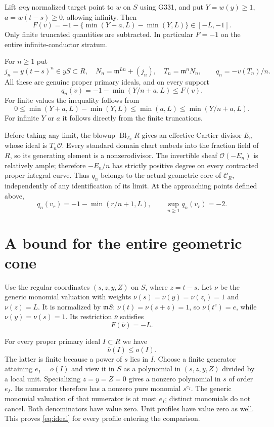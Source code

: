 \documentclass[11pt]{article}
\newcommand{\m}{\mathfrak m}
\newcommand{\Cc}{\mathcal C}
\begin{document}
Lift \emph{any} normalized target point to $w$ on $S$ using G331,
and put $Y=w(y)\ge1$, $a=w(t-s)\ge0$, allowing infinity. Then
\begin{equation}\label{eq:F}
 F(v)=-1-\{\min(Y+a,L)-\min(Y,L)\}\in[-L,-1].
\end{equation}
Only finite truncated quantities are subtracted. In particular
$F=-1$ on the entire infinite-conductor stratum.

For $n\ge1$ put
\[
 j_n=y(t-s)^n\in yS\subset R,\quad
 N_n=\m^{Ln}+(j_n),\quad T_n=\m^nN_n,
 \qquad q_n=-v(T_n)/n.
\]
All these are genuine proper primary ideals, and on every support
\begin{equation}\label{eq:q}
 q_n(v)=-1-\min(Y/n+a,L)\le F(v).
\end{equation}
For finite values the inequality follows from
\[
 0\le\min(Y+a,L)-\min(Y,L)\le\min(a,L)
 \le\min(Y/n+a,L).
\]
For infinite $Y$ or $a$ it follows directly from the finite truncations.

Before taking any limit, the blowup $\operatorname{Bl}_{T_n}R$
gives an effective Cartier divisor $E_n$ whose ideal is $T_n\mathcal O$.
Every standard domain chart embeds into the fraction field of $R$,
so its generating element is a nonzerodivisor.
The invertible sheaf $\mathcal O(-E_n)$ is relatively ample;
therefore $-E_n/n$ has strictly positive degree on every contracted
proper integral curve. Thus $q_n$ belongs to the actual geometric
core of $\Cc_R$, independently of any identification of its limit.
At the approaching points defined above,
\begin{equation}\label{eq:path}
 q_n(v_r)=-1-\min(r/n+1,L),\qquad
 \sup_{n\ge1}q_n(v_r)=-2.
\end{equation}

\section{A bound for the entire geometric cone}
Use the regular coordinates $(s,z,y,Z)$ on $S$, where $z=t-s$.
Let $\nu$ be the generic monomial valuation with weights
$\nu(s)=\nu(y)=\nu(z_i)=1$ and $\nu(z)=L$.
It is normalized by $\m S$: $\nu(t)=\nu(s+z)=1$, so
$\nu(t^e)=e$, while $\nu(y)=\nu(s)=1$.
Its restriction $\bar\nu$ satisfies
\begin{equation}\label{eq:deep}
 F(\bar\nu)=-L.
\end{equation}

For every proper primary ideal $I\subset R$ we have
\begin{equation}\label{eq:ideal}
 \bar\nu(I)\le o(I).
\end{equation}
The latter is finite because a power of $s$ lies in $I$.
Choose a finite generator attaining $e_I=o(I)$ and view it in
$S$ as a polynomial in $(s,z,y,Z)$ divided by a local unit.
Specializing $z=y=Z=0$ gives a nonzero polynomial in $s$ of
order $e_I$. Its numerator therefore has a nonzero pure monomial
$s^{e_I}$. The generic monomial valuation of that numerator is
at most $e_I$; distinct monomials do not cancel. Both denominators
have value zero. Unit profiles have value zero as well.
This proves \eqref{eq:ideal} for every profile entering the comparison.
\end{document}
